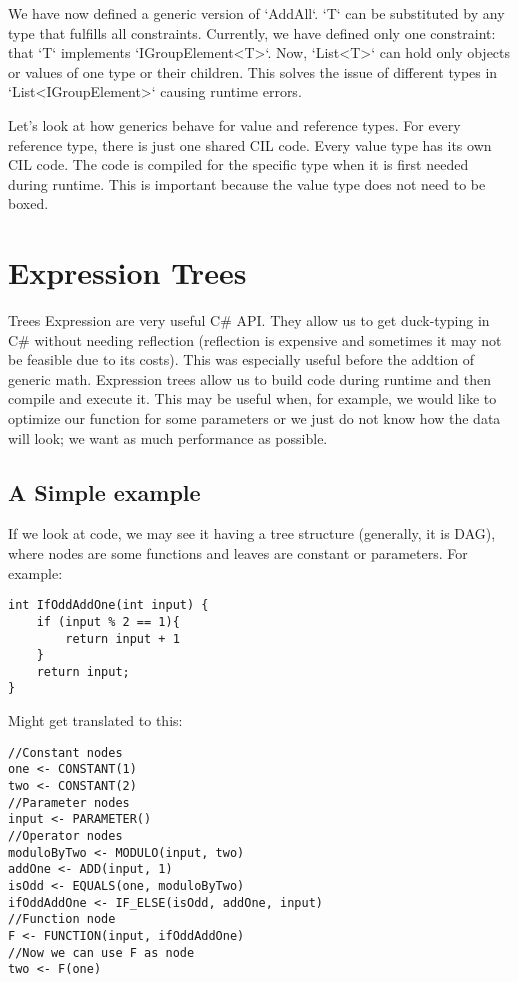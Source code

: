 We have now defined a generic version of `AddAll`. `T` can be substituted by any type that fulfills all constraints. Currently, we have defined only one constraint: that `T` implements `IGroupElement<T>`. Now, `List<T>` can hold only objects or values of one type or their children. This solves the issue of different types in `List<IGroupElement>` causing runtime errors.

Let's look at how generics behave for value and reference types. For every reference type, there is just one shared CIL code. Every value type has its own CIL code. The code is compiled for the specific type when it is first needed during runtime. This is important because the value type does not need to be boxed. \cite{Generics1}

\section{Expression Trees}
Trees Expression are very useful C\# API. They allow us to get duck-typing in C\# without needing reflection (reflection is expensive and sometimes it may not be feasible due to its costs). This was especially useful before the addtion of generic math. Expression trees allow us to build code during runtime and then compile and execute it. This may be useful when, for example, we would like to optimize our function for some parameters or we just do not know how the data will look; we want as much performance as possible.
\subsection{A Simple example}
If we look at code, we may see it having a tree structure (generally, it is DAG), where nodes are some functions and leaves are constant or parameters. For example: 
\begin{lstlisting}
int IfOddAddOne(int input) {
    if (input % 2 == 1){
        return input + 1
    }
    return input;
}
\end{lstlisting}

Might get translated to this:
\begin{lstlisting}
//Constant nodes
one <- CONSTANT(1)
two <- CONSTANT(2)
//Parameter nodes
input <- PARAMETER()
//Operator nodes
moduloByTwo <- MODULO(input, two)
addOne <- ADD(input, 1)
isOdd <- EQUALS(one, moduloByTwo)
ifOddAddOne <- IF_ELSE(isOdd, addOne, input)
//Function node
F <- FUNCTION(input, ifOddAddOne)
//Now we can use F as node
two <- F(one)
\end{lstlisting}
    

